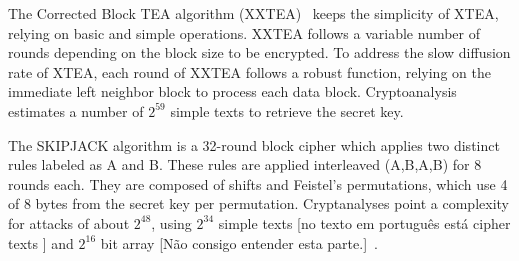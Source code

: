The Corrected Block TEA algorithm (XXTEA)~\cite{wheeler1998correction} keeps the simplicity of  XTEA, relying on basic and simple operations. 
XXTEA follows a %
variable number of rounds depending on the block size to be encrypted. %
To address the slow diffusion rate of XTEA, %
each round of XXTEA follows a robust function, relying on the immediate left neighbor block %
to process each data block. 
Cryptoanalysis estimates a number of $2^{59}$ simple texts  
to retrieve the secret key. %


The SKIPJACK algorithm is a 32-round block cipher which applies two distinct rules labeled as A and B. These rules are applied interleaved (A,B,A,B) for 8 rounds each. They are composed of shifts and Feistel's permutations, which use 4 of 8 bytes from the secret key per permutation. %
Cryptanalyses point a complexity for attacks of about $2^{48}$, using $2^{34}$ {\color{red}simple texts [no texto em português está cipher texts ]} and {\color{red}$2^{16}$ bit array [Não consigo entender esta parte.]}~\cite{biham1999cryptanalysis}.

